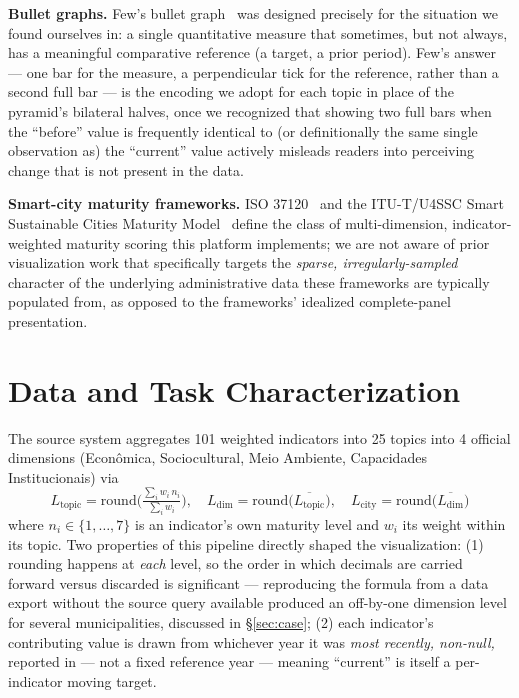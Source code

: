 \documentclass[10pt,twocolumn]{article}
\begin{document}
\textbf{Bullet graphs.} Few's bullet graph~\cite{few2006bullet} was designed precisely for the situation we found ourselves in: a single quantitative measure that sometimes, but not always, has a meaningful comparative reference (a target, a prior period). Few's answer — one bar for the measure, a perpendicular tick for the reference, rather than a second full bar — is the encoding we adopt for each topic in place of the pyramid's bilateral halves, once we recognized that showing two full bars when the ``before'' value is frequently identical to (or definitionally the same single observation as) the ``current'' value actively misleads readers into perceiving change that is not present in the data.

\textbf{Smart-city maturity frameworks.} ISO 37120~\cite{iso37120} and the ITU-T/U4SSC Smart Sustainable Cities Maturity Model~\cite{itu-y4903,u4ssc} define the class of multi-dimension, indicator-weighted maturity scoring this platform implements; we are not aware of prior visualization work that specifically targets the \emph{sparse, irregularly-sampled} character of the underlying administrative data these frameworks are typically populated from, as opposed to the frameworks' idealized complete-panel presentation.

\section{Data and Task Characterization}
The source system aggregates 101 weighted indicators into 25 topics into 4 official dimensions (Econ\^omica, Sociocultural, Meio Ambiente, Capacidades Institucionais) via
\[
L_{\text{topic}} = \mathrm{round}\!\Big(\tfrac{\sum_i w_i\, n_i}{\sum_i w_i}\Big), \quad
L_{\text{dim}} = \mathrm{round}\!\big(\overline{L_{\text{topic}}}\big), \quad
L_{\text{city}} = \mathrm{round}\!\big(\overline{L_{\text{dim}}}\big)
\]
where $n_i \in \{1,\dots,7\}$ is an indicator's own maturity level and $w_i$ its weight within its topic. Two properties of this pipeline directly shaped the visualization: (1) rounding happens at \emph{each} level, so the order in which decimals are carried forward versus discarded is significant — reproducing the formula from a data export without the source query available produced an off-by-one dimension level for several municipalities, discussed in \S\ref{sec:case}; (2) each indicator's contributing value is drawn from whichever year it was \emph{most recently, non-null,} reported in — not a fixed reference year — meaning ``current'' is itself a per-indicator moving target.
\end{document}
